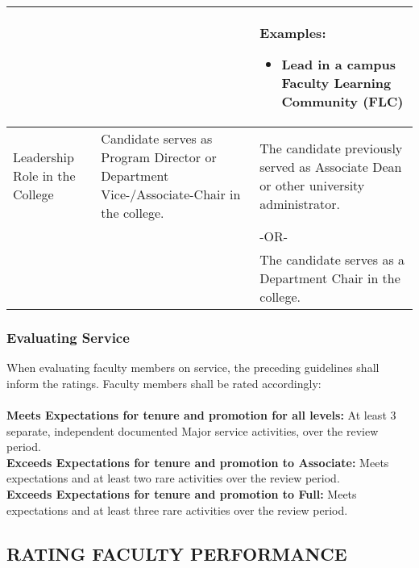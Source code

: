 \documentclass{article}
\begin{document}
\begin{longtable}{p{3cm}p{5.5cm}P{5.5cm}}
 & &
 Examples:
	\begin{itemize}[noitemsep,leftmargin=*,topsep=0pt,partopsep=0pt]
    \item Lead in a campus
Faculty Learning Community
(FLC)
	\end{itemize}
  \\ 
\hline
Leadership Role in the College & Candidate serves as Program Director or Department
Vice-/Associate-Chair in the college.
& The candidate previously served as Associate Dean or other university administrator. \\
& & -OR- \\
& & The candidate serves as a Department Chair in the college. \\
\hline
\end{longtable}

\subsubsection{Evaluating Service}
When evaluating faculty members on service, the preceding guidelines shall inform the ratings. Faculty members shall be rated accordingly:
\\\\
\textbf{Meets Expectations for tenure and promotion for all levels:} At least 3 separate, independent documented Major service activities, over the review period.
\\
\textbf{Exceeds Expectations for tenure and promotion to Associate:} Meets expectations and at least two rare activities over the review period.
\\
\textbf{Exceeds Expectations for tenure and promotion to Full:} Meets expectations and at least three rare activities over the review period.

\subsection{RATING FACULTY PERFORMANCE}
\end{document}
